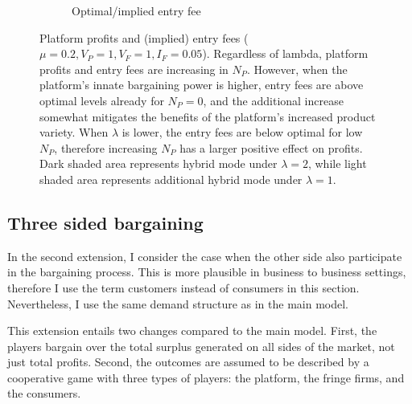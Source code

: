 \documentclass[a4paper]{article}
\begin{document}
\begin{figure}
\begin{subfigure}[b]{0.45\textwidth}
        \caption{Optimal/implied entry fee}
        \label{fig:entry_fee_high_lambda}
    \end{subfigure}
    \caption{Platform profits and (implied) entry fees ($\mu = 0.2, V_P = 1, V_F = 1, I_F = 0.05$). Regardless of lambda, platform profits and entry fees are increasing in $N_P$. However, when the platform's innate bargaining power is higher, entry fees are above optimal levels already for $N_P = 0$, and the additional increase somewhat mitigates the benefits of the platform's increased product variety. When $\lambda$ is lower, the entry fees are below optimal for low $N_P$, therefore increasing $N_P$ has a larger positive effect on profits. Dark shaded area represents hybrid mode under $\lambda=2$, while light shaded area represents additional hybrid mode under $\lambda=1$.}
    \label{fig:profits_and_entry_fees_high_lambda}
\end{figure}


\subsection{Three sided bargaining}
\label{sec:two_sided}

In the second extension, I consider the case when the other side also participate in the bargaining process.
This is more plausible in business to business settings, therefore I use the term customers instead of consumers in this section.
Nevertheless, I use the same demand structure as in the main model.

This extension entails two changes compared to the main model.
First, the players bargain over the total surplus generated on all sides of the market, not just total profits.
Second, the outcomes are assumed to be described by a cooperative game with three types of players: the platform, the fringe firms, and the consumers.
\end{document}
